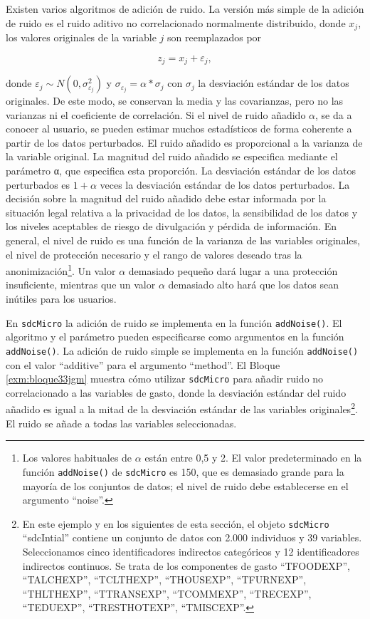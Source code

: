 \documentclass[]{book}
\theoremstyle{definition}
\theoremstyle{definition}
\theoremstyle{definition}
\theoremstyle{definition}
\theoremstyle{remark}
\begin{document}
Existen varios algoritmos de adición de ruido. La versión más simple de la adición de ruido es el ruido aditivo no correlacionado normalmente distribuido, donde \(x_j\), los valores originales de la variable \(j\) son reemplazados por

\[z_{j} = x_{j} + \varepsilon_{j},\]

donde \(\varepsilon_{j} \sim N(0, \sigma_{\varepsilon_{j}}^{2})\) y \(\sigma_{\varepsilon_{j}} = \alpha * \sigma_{j}\) con \(\sigma_{j}\) la desviación estándar de los datos originales. De este modo, se conservan la media y las covarianzas, pero no las varianzas ni el coeficiente de correlación. Si el nivel de ruido añadido \(\alpha\), se da a conocer al usuario, se pueden estimar muchos estadísticos de forma coherente a partir de los datos perturbados. El ruido añadido es proporcional a la varianza de la variable original. La magnitud del ruido añadido se especifica mediante el parámetro α, que especifica esta proporción. La desviación estándar de los datos perturbados es \(1 + \alpha\) veces la desviación estándar de los datos perturbados. La decisión sobre la magnitud del ruido añadido debe estar informada por la situación legal relativa a la privacidad de los datos, la sensibilidad de los datos y los niveles aceptables de riesgo de divulgación y pérdida de información. En general, el nivel de ruido es una función de la varianza de las variables originales, el nivel de protección necesario y el rango de valores deseado tras la anonimización\footnote{Los valores habituales de \(\alpha\) están entre 0,5 y 2. El valor predeterminado en la función \texttt{addNoise()} de \texttt{sdcMicro} es 150, que es demasiado grande para la mayoría de los conjuntos de datos; el nivel de ruido debe establecerse en el argumento ``noise''.}. Un valor \(\alpha\) demasiado pequeño dará lugar a una protección insuficiente, mientras que un valor \(\alpha\) demasiado alto hará que los datos sean inútiles para los usuarios.

En \texttt{sdcMicro} la adición de ruido se implementa en la función \texttt{addNoise()}. El algoritmo y el parámetro pueden especificarse como argumentos en la función \texttt{addNoise()}. La adición de ruido simple se implementa en la función \texttt{addNoise()} con el valor ``additive'' para el argumento ``method''. El Bloque \ref{exm:bloque33jgm} muestra cómo utilizar \texttt{sdcMicro} para añadir ruido no correlacionado a las variables de gasto, donde la desviación estándar del ruido añadido es igual a la mitad de la desviación estándar de las variables originales\footnote{En este ejemplo y en los siguientes de esta sección, el objeto \texttt{sdcMicro} ``sdcIntial'' contiene un conjunto de datos con 2.000 individuos y 39 variables. Seleccionamos cinco identificadores indirectos categóricos y 12 identificadores indirectos continuos. Se trata de los componentes de gasto ``TFOODEXP'', ``TALCHEXP'', ``TCLTHEXP'', ``THOUSEXP'', ``TFURNEXP'', ``THLTHEXP'', ``TTRANSEXP'', ``TCOMMEXP'', ``TRECEXP'', ``TEDUEXP'', ``TRESTHOTEXP'', ``TMISCEXP''.}. El ruido se añade a todas las variables seleccionadas.
\end{document}
